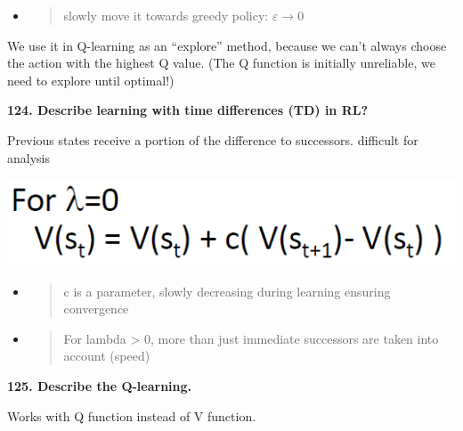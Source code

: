 \begin{itemize}
\item
  \begin{quote}
  slowly move it towards greedy policy: $\varepsilon \to 0$
  \end{quote}
\end{itemize}

We use it in Q-learning as an ``explore'' method, because we can't
always choose the action with the highest Q value. (The Q function is
initially unreliable, we need to explore until optimal!)

\textbf{124. Describe learning with time differences (TD) in RL?}

Previous states receive a portion of the difference to successors.
difficult for analysis

\includegraphics[width=\columnwidth]{media/image7.png}

\begin{itemize}
\item
  \begin{quote}
  c is a parameter, slowly decreasing during learning ensuring
  convergence
  \end{quote}
\item
  \begin{quote}
  For lambda \textgreater{} 0, more than just immediate successors are
  taken into account (speed)
  \end{quote}
\end{itemize}

\textbf{125. Describe the Q-learning.}

Works with Q function instead of V function.

